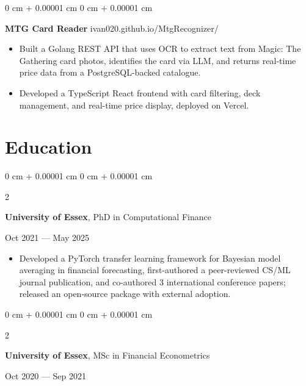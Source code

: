 \documentclass[6pt, letterpaper]{article}
\newenvironment{highlights}{
    \begin{itemize}[
        topsep=0.03 cm,
        parsep=0.03 cm,
        partopsep=0pt,
        itemsep=0pt,
        leftmargin=0 cm + 10pt
    ]
}{
    \end{itemize}
} %
\newenvironment{onecolentry}{
    \begin{adjustwidth}{
        0 cm + 0.00001 cm
    }{
        0 cm + 0.00001 cm
    }
}{
    \end{adjustwidth}
} %
\newenvironment{twocolentry}[2][]{
    \onecolentry
    \def\secondColumn{#2}
    \setcolumnwidth{\fill, 4.5 cm}
    \begin{paracol}{2}
}{
    \switchcolumn \raggedleft \secondColumn
    \end{paracol}
    \endonecolentry
} %
\begin{document}
    \begin{onecolentry}
        \textbf{MTG Card Reader} \hfill ivan020.github.io/MtgRecognizer/

        \begin{highlights}

            \item Built a Golang REST API that uses OCR to extract text from Magic: The Gathering card photos, identifies the card via LLM, and returns real-time price data from a PostgreSQL-backed catalogue.
            \item Developed a TypeScript React frontend with card filtering, deck management, and real-time price display, deployed on Vercel.

        \end{highlights}
    \end{onecolentry}

    \section{Education}

            \begin{twocolentry}{
                Oct 2021 --- May 2025
            }
            \textbf{University of Essex}, PhD in Computational Finance
            \end{twocolentry}

            \begin{highlights}

            \item Developed a PyTorch transfer learning framework for Bayesian model averaging in financial forecasting, first-authored a peer-reviewed CS/ML journal publication, and co-authored 3 international conference papers; released an open-source package with external adoption.

            \end{highlights}

            \begin{twocolentry}{
                Oct 2020 --- Sep 2021
            }
            \textbf{University of Essex}, MSc in Financial Econometrics
            \end{twocolentry}
\end{document}
